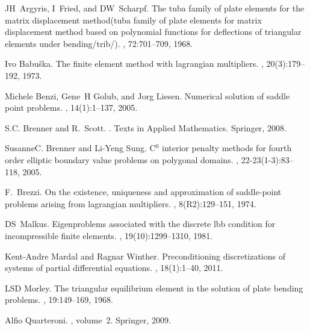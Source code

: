 \documentclass{marine_2015}
\begin{document}
%
\newpage
\begin{thebibliography}{10}

JH~Argyris, I~Fried, and DW~Scharpf.
\newblock The tuba family of plate elements for the matrix displacement
  method(tuba family of plate elements for matrix displacement method based on
  polynomial functions for deflections of triangular elements under
  bending/trib/).
, 72:701--709, 1968.

Ivo Babuška.
\newblock The finite element method with lagrangian multipliers.
, 20(3):179--192, 1973.

Michele Benzi, Gene~H Golub, and Jorg Liesen.
\newblock Numerical solution of saddle point problems.
, 14(1):1--137, 2005.

S.C. Brenner and R.~Scott.
.
\newblock Texts in Applied Mathematics. Springer, 2008.

SusanneC. Brenner and Li-Yeng Sung.
\newblock C$^0$ interior penalty methods for fourth order elliptic boundary value
  problems on polygonal domains.
, 22-23(1-3):83--118, 2005.

F.~Brezzi.
\newblock On the existence, uniqueness and approximation of saddle-point
  problems arising from lagrangian multipliers.
, 8(R2):129--151, 1974.

DS~Malkus.
\newblock Eigenproblems associated with the discrete lbb condition for
  incompressible finite elements.
,
  19(10):1299--1310, 1981.

Kent-Andre Mardal and Ragnar Winther.
\newblock Preconditioning discretizations of systems of partial differential
  equations.
, 18(1):1--40, 2011.

LSD Morley.
\newblock The triangular equilibrium element in the solution of plate bending
  problems.
, 19:149--169, 1968.

Alfio Quarteroni.
, volume~2.
\newblock Springer, 2009.


\end{thebibliography}
\end{document}
